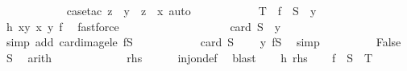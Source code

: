 \begin{isabellebody}
\ \ \ \ \ \ \ \ \ \ \isamarkupfalse%
\ {\isacharparenleft}{\kern0pt}case{\isacharunderscore}{\kern0pt}tac\ {\isachardoublequoteopen}z\ {\isacharequal}{\kern0pt}\ y\ {\isasymlongrightarrow}\ z\ {\isacharequal}{\kern0pt}\ x{\isachardoublequoteclose}{\isacharparenright}{\kern0pt}\ auto\isanewline
\ \ \ \ \ \ \ \ \isamarkupfalse%
\ \isamarkupfalse%
\ {\isachardoublequoteopen}T\ {\isasymsubseteq}\ f\ {\isacharbackquote}{\kern0pt}\ {\isacharparenleft}{\kern0pt}S\ {\isacharminus}{\kern0pt}\ {\isacharbraceleft}{\kern0pt}y{\isacharbraceright}{\kern0pt}{\isacharparenright}{\kern0pt}{\isachardoublequoteclose}\isanewline
\ \ \ \ \ \ \ \ \ \ \isamarkupfalse%
\ h\ xy\ x\ y\ f\ \isamarkupfalse%
\ fastforce\isanewline
\ \ \ \ \ \ \isamarkupfalse%
\isanewline
\ \ \ \ \ \ \isamarkupfalse%
\ \isamarkupfalse%
\ {\isachardoublequoteopen}\ {\isasymdots}\ {\isasymle}\ card\ {\isacharparenleft}{\kern0pt}S\ {\isacharminus}{\kern0pt}\ {\isacharbraceleft}{\kern0pt}y{\isacharbraceright}{\kern0pt}{\isacharparenright}{\kern0pt}{\isachardoublequoteclose}\isanewline
\ \ \ \ \ \ \ \ \isamarkupfalse%
\ {\isacharparenleft}{\kern0pt}simp\ add{\isacharcolon}{\kern0pt}\ card{\isacharunderscore}{\kern0pt}image{\isacharunderscore}{\kern0pt}le\ fS{\isacharparenright}{\kern0pt}\isanewline
\ \ \ \ \ \ \isamarkupfalse%
\ \isamarkupfalse%
\ {\isachardoublequoteopen}{\isasymdots}\ {\isasymle}\ card\ S\ {\isacharminus}{\kern0pt}\ {}{\isachardoublequoteclose}\ \isamarkupfalse%
\ y\ fS\ \isamarkupfalse%
\ simp\isanewline
\ \ \ \ \ \ \isamarkupfalse%
\ \isamarkupfalse%
\ False\ \isamarkupfalse%
\ S{}\ \isamarkupfalse%
\ arith\isanewline
\ \ \ \ \isamarkupfalse%
\isanewline
\ \ \isacommand{{\isacharbraceright}{\kern0pt}}\isamarkupfalse%
\isanewline
\ \ \isamarkupfalse%
\ \isamarkupfalse%
\ {\isacharquery}{\kern0pt}rhs\isanewline
\ \ \ \ \isamarkupfalse%
\ inj{\isacharunderscore}{\kern0pt}on{\isacharunderscore}{\kern0pt}def\ \isamarkupfalse%
\ blast\isanewline
{}\isamarkupfalse%
\isanewline
\ \ \isamarkupfalse%
\ h{\isacharcolon}{\kern0pt}\ {\isacharquery}{\kern0pt}rhs\isanewline
\ \ \isamarkupfalse%
\ {\isachardoublequoteopen}f\ {\isacharbackquote}{\kern0pt}\ S\ {\isacharequal}{\kern0pt}\ T{\isachardoublequoteclose}\isanewline

\end{isabellebody}
